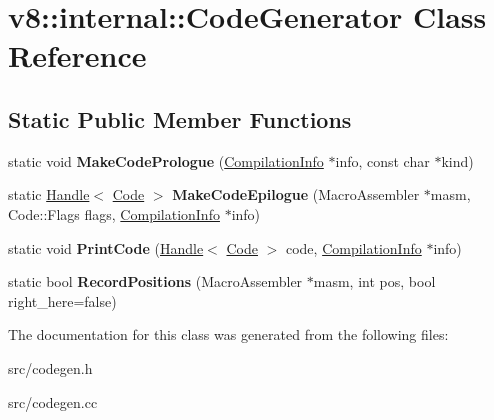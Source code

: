 \hypertarget{classv8_1_1internal_1_1_code_generator}{}\section{v8\+:\+:internal\+:\+:Code\+Generator Class Reference}
\label{classv8_1_1internal_1_1_code_generator}
\subsection*{Static Public Member Functions}
\begin{DoxyCompactItemize}
\item 
\hypertarget{classv8_1_1internal_1_1_code_generator_a931dbe0924d277d6a48d11e756fbaa9f}{}static void {\bfseries Make\+Code\+Prologue} (\hyperlink{classv8_1_1internal_1_1_compilation_info}{Compilation\+Info} $\ast$info, const char $\ast$kind)\label{classv8_1_1internal_1_1_code_generator_a931dbe0924d277d6a48d11e756fbaa9f}

\item 
\hypertarget{classv8_1_1internal_1_1_code_generator_aa87da632c9adea4c2419c7756e485b47}{}static \hyperlink{classv8_1_1internal_1_1_handle}{Handle}$<$ \hyperlink{classv8_1_1internal_1_1_code}{Code} $>$ {\bfseries Make\+Code\+Epilogue} (Macro\+Assembler $\ast$masm, Code\+::\+Flags flags, \hyperlink{classv8_1_1internal_1_1_compilation_info}{Compilation\+Info} $\ast$info)\label{classv8_1_1internal_1_1_code_generator_aa87da632c9adea4c2419c7756e485b47}

\item 
\hypertarget{classv8_1_1internal_1_1_code_generator_a1fa768e3e0686b6dbd5bcf2b50f05023}{}static void {\bfseries Print\+Code} (\hyperlink{classv8_1_1internal_1_1_handle}{Handle}$<$ \hyperlink{classv8_1_1internal_1_1_code}{Code} $>$ code, \hyperlink{classv8_1_1internal_1_1_compilation_info}{Compilation\+Info} $\ast$info)\label{classv8_1_1internal_1_1_code_generator_a1fa768e3e0686b6dbd5bcf2b50f05023}

\item 
\hypertarget{classv8_1_1internal_1_1_code_generator_a2c35613e52c402ea3d13bc6d6ad03989}{}static bool {\bfseries Record\+Positions} (Macro\+Assembler $\ast$masm, int pos, bool right\+\_\+here=false)\label{classv8_1_1internal_1_1_code_generator_a2c35613e52c402ea3d13bc6d6ad03989}

\end{DoxyCompactItemize}


The documentation for this class was generated from the following files\+:\begin{DoxyCompactItemize}
\item 
src/codegen.\+h\item 
src/codegen.\+cc\end{DoxyCompactItemize}
